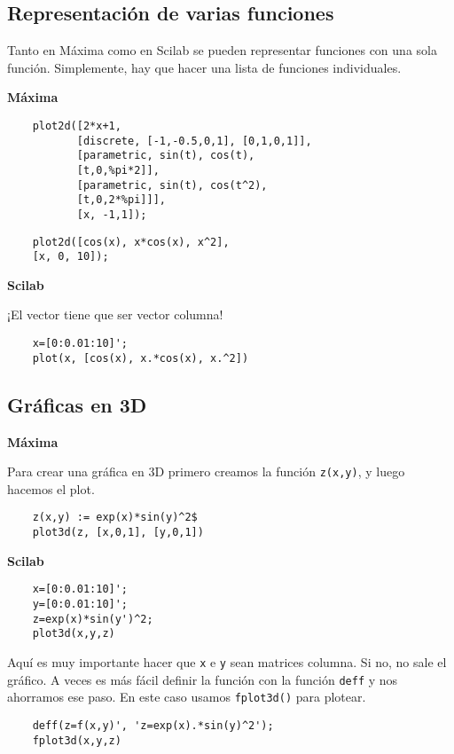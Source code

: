 \documentclass[a4paper]{article}
\begin{document}
\subsection{Representación de varias funciones}
Tanto en Máxima como en Scilab se pueden representar funciones con una sola función. Simplemente, hay que hacer una lista de funciones individuales.
\begin{multicols}{2}
	\begin{center}
		\textbf{Máxima}
	\end{center}

	\begin{verbatim}
	plot2d([2*x+1,    
	       [discrete, [-1,-0.5,0,1], [0,1,0,1]],  
	       [parametric, sin(t), cos(t), 
	       [t,0,%pi*2]],  
	       [parametric, sin(t), cos(t^2), 
	       [t,0,2*%pi]]], 
	       [x, -1,1]);
	\end{verbatim}
	\begin{verbatim}
	plot2d([cos(x), x*cos(x), x^2], 
	[x, 0, 10]);
	\end{verbatim}

	\columnbreak
	
	
	\begin{center}
		\textbf{Scilab}
	\end{center}
¡El vector tiene que ser vector columna!
	\begin{verbatim}
	x=[0:0.01:10]';
	plot(x, [cos(x), x.*cos(x), x.^2])
	\end{verbatim}
\end{multicols}


\subsection{Gráficas en 3D}
\begin{multicols}{2}
	\begin{center}
		\textbf{Máxima}
	\end{center}
	Para crear una gráfica en 3D primero creamos la función \verb|z(x,y)|, y luego hacemos el plot.
	\begin{verbatim}
	z(x,y) := exp(x)*sin(y)^2$
	plot3d(z, [x,0,1], [y,0,1])
	\end{verbatim}
	
	\columnbreak
	
	
	\begin{center}
		\textbf{Scilab}
	\end{center}
	\begin{verbatim}
	x=[0:0.01:10]';
	y=[0:0.01:10]';
	z=exp(x)*sin(y')^2;
	plot3d(x,y,z)
	\end{verbatim}
	
	Aquí es muy importante hacer que \verb|x| e \verb|y| sean matrices columna. Si no, no sale el gráfico. A veces es más fácil definir la función con la función \verb|deff| y nos ahorramos ese paso. En este caso usamos \verb|fplot3d()| para plotear.
	
	\begin{verbatim}
	deff(z=f(x,y)', 'z=exp(x).*sin(y)^2');
	fplot3d(x,y,z)
	\end{verbatim}
	
\end{multicols}
\end{document}
